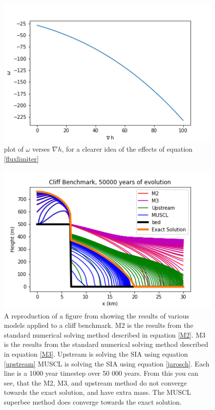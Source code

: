 \documentclass{article}
\begin{document}
\begin{figure}[H]
    \centering
    \includegraphics[width=13cm]{Iceflux.png}
    \caption{plot of $\omega$ verses $\nabla h$, for a clearer idea of the effects of equation \ref{fluxlimiter}
}
    \label{fig:Iceflux}
\end{figure}
\begin{figure}[H]
    \centering
    \includegraphics[width=13cm]{Glacier Model.png}
    \caption{A reproduction of a figure from \citet{Jarosch2013} showing the results of various models applied to a cliff benchmark. M2 is the results from the standard numerical solving method described in equation \ref{M2}. M3 is the results from the standard numerical solving method described in equation \ref{M3}.  Upstream is solving the SIA using equation \ref{upstream} MUSCL is solving the SIA using equation \ref{jarosch}. Each line is a 1000 year timestep over 50 000 years. From this you can see, that the M2, M3, and upstream method do not converge towards the exact solution, and have extra mass. The MUSCL superbee method does converge towards the exact solution.
}
    \label{fig:JaroschPaper}
\end{figure}
\end{document}
